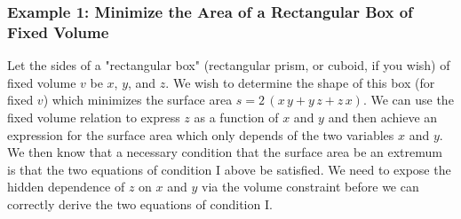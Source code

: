 \documentclass[12pt]{article}
\begin{document}
\subsubsection{Example 1: Minimize the Area of a Rectangular Box of Fixed Volume}
Let the sides of a "rectangular box" (rectangular prism, or cuboid, if you wish) of
  fixed volume $v$ be $x$, $y$, and $z$.
We wish to determine the shape of this box (for fixed $v$) which minimizes the surface
  area $s = 2\,(x\,y + y\,z + z\,x)$.
We can use the fixed volume relation to express $z$ as a function of $x$ and $y$
  and then achieve an expression for the surface area which only depends of the 
   two variables $x$ and $y$.
We then know that a necessary condition that the surface area be an extremum
  is that the two equations of condition I above be satisfied.
We need to expose the hidden dependence of $z$ on $x$ and $y$ via the volume constraint
  before we can correctly derive the two equations of condition I.  
  
\end{document}
